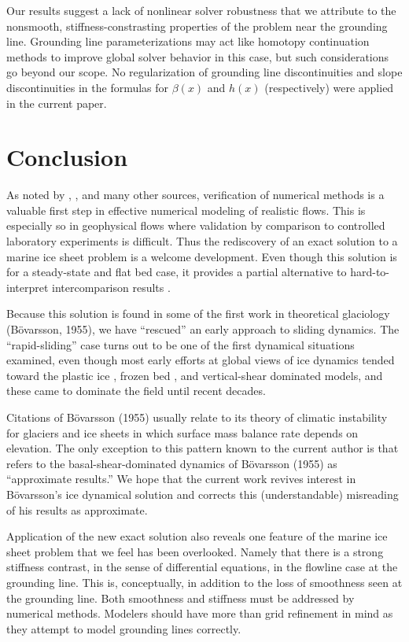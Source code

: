 \documentclass[twocolumn]{igs}
\renewcommand{\dh}{\fontencoding{T1}\selectfont{\symbol{240}}}
\newcommand{\bod}{B\"o\dh varsson\xspace}
\newcommand{\citebod}{B\"o\dh varsson (1955)\nocite{Bodvardsson}\xspace}
\newcommand{\citepbod}{(B\"o\dh varsson, 1955)\nocite{Bodvardsson}\xspace}
\begin{document}
Our results suggest a lack of nonlinear solver robustness that we attribute to the nonsmooth, stiffness-constrasting properties of the problem near the grounding line.  Grounding line parameterizations \citep[e.g.][]{Gladstoneetal2010,Feldmannetal2014} may act like homotopy continuation methods \citep{Kelley} to improve global solver behavior in this case, but such considerations go beyond our scope.  No regularization of grounding line discontinuities and slope discontinuities in the formulas for $\beta(x)$ and $h(x)$ (respectively) were applied in the current paper.


\section{Conclusion}  As noted by \cite{BLKCB}, \cite{Wesseling}, and many other sources, verification of numerical methods is a valuable first step in effective numerical modeling of realistic flows.  This is especially so in geophysical flows where validation by comparison to controlled laboratory experiments is difficult.  Thus the rediscovery of an exact solution to a marine ice sheet problem is a welcome development.  Even though this solution is for a steady-state and flat bed case, it provides a partial alternative to hard-to-interpret intercomparison results \citep{MISMIP2012}.

Because this solution is found in some of the first work in theoretical glaciology \citepbod, we have ``rescued'' an early approach to sliding dynamics.  The ``rapid-sliding'' case turns out to be one of the first dynamical situations examined, even though most early efforts at global views of ice dynamics tended toward the plastic ice \citep{Orowan,Nye52plastic}, frozen bed \citep{Vialov}, and vertical-shear dominated \citep{Weertman61stability} models, and these came to dominate the field until recent decades.

Citations of \citebod usually relate to its theory of climatic instability for glaciers and ice sheets in which surface mass balance rate depends on elevation.  The only exception to this pattern known to the current author is that \cite{Fowler1992} refers to the basal-shear-dominated dynamics of \citebod as ``approximate results.''  We hope that the current work revives interest in \bod's ice dynamical solution and corrects this (understandable) misreading of his results as approximate.

Application of the new exact solution also reveals one feature of the marine ice sheet problem that we feel has been overlooked.  Namely that there is a strong stiffness contrast, in the sense of differential equations, in the flowline case at the grounding line.  This is, conceptually, in addition to the loss of smoothness seen at the grounding line.  Both smoothness and stiffness must be addressed by numerical methods.  Modelers should have more than grid refinement in mind as they attempt to model grounding lines correctly.
\end{document}
